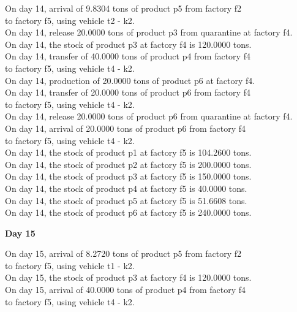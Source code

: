 \begin{table}[H]
\begin{multicols}{2}
\begin{tabbing}
On day 14, arrival of 9.8304 tons of product p5 from factory f2 \\ to factory f5, using vehicle t2 - k2. \\
On day 14, release 20.0000 tons of product p3 from quarantine at factory f4. \\
On day 14, the stock of product p3 at factory f4 is 120.0000 tons. \\
On day 14, transfer of 40.0000 tons of product p4 from factory f4 \\ to factory f5, using vehicle t4 - k2. \\
On day 14, production of 20.0000 tons of product p6 at factory f4. \\
On day 14, transfer of 20.0000 tons of product p6 from factory f4 \\ to factory f5, using vehicle t4 - k2. \\
On day 14, release 20.0000 tons of product p6 from quarantine at factory f4. \\
On day 14, arrival of 20.0000 tons of product p6 from factory f4 \\ to factory f5, using vehicle t4 - k2. \\
On day 14, the stock of product p1 at factory f5 is 104.2600 tons. \\
On day 14, the stock of product p2 at factory f5 is 200.0000 tons. \\
On day 14, the stock of product p3 at factory f5 is 150.0000 tons. \\
On day 14, the stock of product p4 at factory f5 is 40.0000 tons. \\
On day 14, the stock of product p5 at factory f5 is 51.6608 tons. \\
On day 14, the stock of product p6 at factory f5 is 240.0000 tons. \\
\end{tabbing} \vspace{-2.0em}
\textbf{Day 15}
\vspace{-1.6em}
\begin{tabbing}
On day 15, arrival of 8.2720 tons of product p5 from factory f2 \\ to factory f5, using vehicle t1 - k2. \\
On day 15, the stock of product p3 at factory f4 is 120.0000 tons. \\
On day 15, arrival of 40.0000 tons of product p4 from factory f4 \\ to factory f5, using vehicle t4 - k2. \\

\end{tabbing}
\end{multicols}
\end{table}
